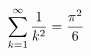 \documentclass[preview]{standalone}
\begin{document}
\begin{align*}\sum_{k=1}^\infty {1 \over k^2} = {\pi^2 \over 6}\end{align*}
\end{document}
